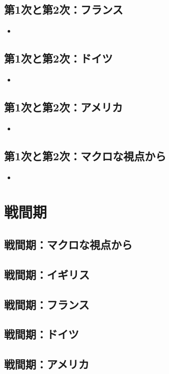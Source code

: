 \documentclass{jsarticle}
\begin{document}
\subsection{第1次と第2次：フランス}
\begin{itemize}
\item 
\end{itemize}
\subsection{第1次と第2次：ドイツ}
\begin{itemize}
\item 
\end{itemize}
\subsection{第1次と第2次：アメリカ}
\begin{itemize}
\item 
\end{itemize}
\subsection{第1次と第2次：マクロな視点から}
\begin{itemize}
\item 
\end{itemize}

\section{戦間期}
\subsection{戦間期：マクロな視点から}
\subsection{戦間期：イギリス}
\subsection{戦間期：フランス}
\subsection{戦間期：ドイツ}
\subsection{戦間期：アメリカ}
\end{document}
